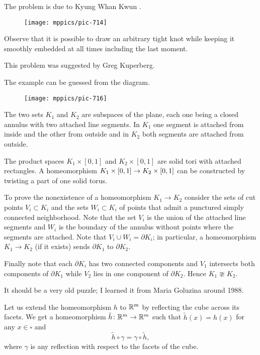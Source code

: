 The problem is due to Kyung Whan Kwun \cite{kwun}.


\begin{figure}[!ht]
\vskip0mm
\centering
\texttt{[image: mppics/pic-714]}
\end{figure}

Observe that it is possible to draw an arbitrary tight knot 
while keeping it smoothly embedded at all times including the last moment.\qeds

This problem was suggested by Greg Kuperberg.


The example can be guessed from the diagram.

\begin{wrapfigure}[6]{r}{50 mm}
\vskip-0mm
\centering
\texttt{[image: mppics/pic-716]}
\end{wrapfigure}

The two sets $K_1$ and $K_2$ are subspaces of the plane, 
each one being a closed annulus with two attached line segments.
In $K_1$ one segment is attached from inside and the other from outside and 
in $K_2$ both segments are attached from outside.

The product spaces $K_1\times[0,1]$ and $K_2\times[0,1]$ are solid tori with attached rectangles.
A homeomorphism $K_1\times[0,1]\z\to K_2\times[0,1]$ can be constructed by twisting a part of one solid torus.

To prove the nonexistence of a homeomorphism $K_1\to K_2$ consider the sets of cut points $V_i\subset K_i$ and the sets $W_i\subset K_i$ of points that admit a punctured simply connected neighborhood.
Note that the set $V_i$ is the union of the attached line segments 
and $W_i$ is the boundary of the annulus without points where the segments are attached.
Note that $V_i\cup W_i=\partial K_i$;
in particular, a homeomorphism $K_1\to K_2$ (if it exists) sends $\partial K_1$ to $\partial K_2$.

Finally note that each $\partial K_i$ has two connected components and 
$V_1$ intersects both components of $\partial K_1$
while $V_2$ lies in one component of $\partial K_2$.
Hence $K_1\ncong K_2$.
\qeds

It should be a very old puzzle;
I learned it from Maria Goluzina around 1988.


Let us extend the homeomorphism $h$ to $\mathbb{R}^m$ by reflecting the cube across its facets.
We get a homeomorphism $\tilde h\colon\mathbb{R}^m\to\mathbb{R}^m$ such that $\tilde h(x)=h(x)$ for any $x\in\square$ and 
\[\tilde h\circ\gamma=\gamma\circ \tilde h,\]
where $\gamma$ is any reflection with respect to the facets of the cube.

